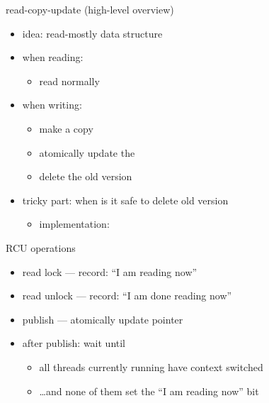 \begin{frame}{read-copy-update (high-level overview)}
    \begin{itemize}
    \item idea: read-mostly data structure
    \item when reading:
        \begin{itemize}
        \item read normally 
        \end{itemize}
    \item when writing:
        \begin{itemize}
        \item make a copy 
        \item atomically update the 
        \item delete the old version 
        \end{itemize}
    \item tricky part: when is it safe to delete old version
        \begin{itemize}
        \item implementation: 
        \end{itemize}
    \end{itemize}
\end{frame}

\begin{frame}{RCU operations}
    \begin{itemize}
    \item read lock --- record: ``I am reading now''
    \item read unlock --- record: ``I am done reading now''
    \item publish --- atomically update pointer
    \vspace{.5cm}
    \item after publish: wait until
        \begin{itemize}
        \item all threads currently running have context switched
        \item \ldots and none of them set the ``I am reading now'' bit
        \end{itemize}
    \end{itemize}
\end{frame}
